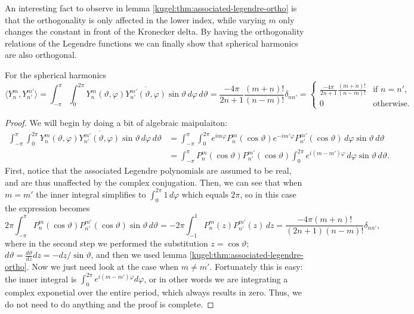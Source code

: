 An interesting fact to observe in lemma
\ref{kugel:thm:associated-legendre-ortho} is that the orthogonality is only
affected in the lower index, while varying $m$ only changes the constant in
front of the Kronecker delta. By having the orthogonality relations of the
Legendre functions we can finally show that spherical harmonics are also
orthogonal.

\begin{lemma} For the spherical harmonics
  \label{kugel:thm:spherical-harmonics-ortho}
  \begin{equation*}
    \langle Y^m_n, Y^{m'}_{n'} \rangle
    = \int_{-\pi}^\pi \int_0^{2\pi}
      Y^m_n(\vartheta, \varphi) \overline{Y^{m'}_{n'}(\vartheta, \varphi)}
      \sin \vartheta \, d\varphi \, d\vartheta
    = \frac{-4\pi}{2n + 1} \frac{(m + n)!}{(n - m)!} \delta_{nn'}
    = \begin{cases}
      \frac{-4\pi}{2n + 1} \frac{(m + n)!}{(n - m)!} & \text{if } n = n', \\
      0 & \text{otherwise}.
    \end{cases}
  \end{equation*}
\end{lemma}
\begin{proof}
  We will begin by doing a bit of algebraic maipulaiton:
  \begin{align*}
    \int_{-\pi}^\pi \int_0^{2\pi}
      Y^m_n(\vartheta, \varphi) \overline{Y^{m'}_{n'}(\vartheta, \varphi)}
      \sin \vartheta \, d\varphi \, d\vartheta
    &= \int_{-\pi}^\pi \int_0^{2\pi}
      e^{im\varphi} P^m_n(\cos \vartheta)
      e^{-im'\varphi} P^{m'}_{n'}(\cos \vartheta)
      \, d\varphi \sin \vartheta \, d\vartheta
    \\
    &= \int_{-\pi}^\pi
      P^m_n(\cos \vartheta) P^{m'}_{n'}(\cos \vartheta)
      \int_0^{2\pi} e^{i(m - m')\varphi}
      \, d\varphi \sin \vartheta \, d\vartheta
      .
  \end{align*}
  First, notice that the associated Legendre polynomials are assumed to be real,
  and are thus unaffected by the complex conjugation. Then, we can see that when
  $m = m'$ the inner integral simplifies to $\int_0^{2\pi} 1 \, d\varphi$ which
  equals $2\pi$, so in this case the expression becomes
  \begin{equation*}
    2\pi \int_{-\pi}^\pi
      P^m_n(\cos \vartheta) P^{m'}_{n'}(\cos \vartheta)
    \sin \vartheta \, d\vartheta
    = -2\pi \int_{-1}^1 P^m_n(z) P^{m'}_{n'}(z) \, dz
    = \frac{-4\pi(m + n)!}{(2n + 1)(n - m)!} \delta_{nn'},
  \end{equation*}
  where in the second step we performed the substitution $z = \cos\vartheta$;
  $d\vartheta = \frac{d\vartheta}{dz} dz= - dz / \sin \vartheta$, and then we
  used lemma \ref{kugel:thm:associated-legendre-ortho}. Now we just need look at
  the case when $m \neq m'$. Fortunately this is easy: the inner integral is
  $\int_0^{2\pi} e^{i(m - m')\varphi} d\varphi$, or in other words we are
  integrating a complex exponetial over the entire period, which always results
  in zero. Thus, we do not need to do anything and the proof is complete.
\end{proof}

